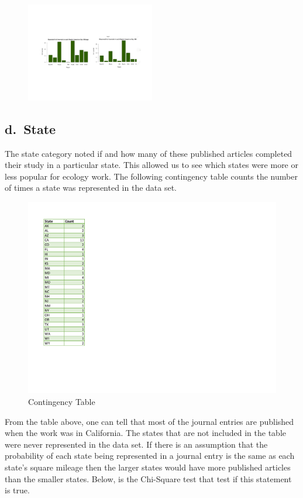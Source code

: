 \documentclass[
]{article}
\begin{document}
\begin{figure}
    \centering
    \includegraphics[width=0.50\textwidth]{Regions2BarGraph.pdf}
    \label{fig:Continent Bar Graph}
\end{figure}

\hypertarget{d.-state}{%
\subsection{d.~State}\label{d.-state}}

The state category noted if and how many of these published articles
completed their study in a particular state. This allowed us to see
which states were more or less popular for ecology work. The following
contingency table counts the number of times a state was represented in
the data set.

\begin{figure}
  \caption{Contingency Table}
    \includegraphics[width=13cm]{statetable.pdf}
\end{figure}

From the table above, one can tell that most of the journal entries are
published when the work was in California. The states that are not
included in the table were never represented in the data set. If there
is an assumption that the probability of each state being represented in
a journal entry is the same as each state's square mileage then the
larger states would have more published articles than the smaller
states. Below, is the Chi-Square test that test if this statement is
true.
\end{document}
